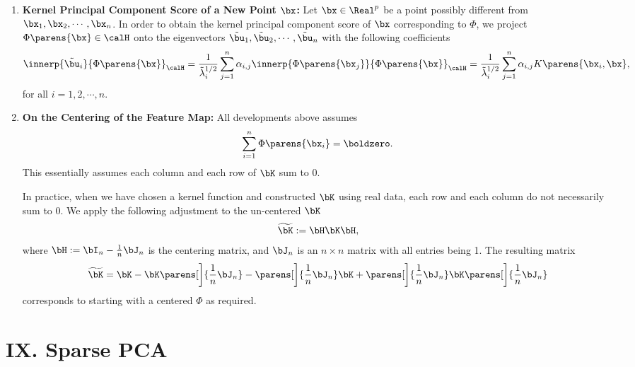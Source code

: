 \documentclass[12pt]{article}
\begin{document}
\begin{enumerate}[label=\textbf{\arabic*.}]
\begin{enumerate}
	\end{enumerate}
	
	\item \textbf{Kernel Principal Component Score of a New Point $\bx$:} Let $\bx \in \Real^p$ be a point possibly different from $\bx_1, \bx_2, \cdots, \bx_n$. In order to obtain the kernel principal component score of $\bx$ corresponding to $\Phi$, we project $\Phi \parens{\bx} \in \calH$ onto the eigenvectors $\tilde{\bu}_1, \tilde{\bu}_2, \cdots, \tilde{\bu}_n$ with the following coefficients 
	\begin{align*}
		\innerp{\tilde{\bu}_i}{\Phi \parens{\bx}}_{\calH} = \frac{1}{\tilde{\lambda}_i^{1/2}} \sum_{j=1}^n \alpha_{i,j} \innerp{\Phi \parens{\bx_j}}{\Phi \parens{\bx}}_{\calH} = \frac{1}{\tilde{\lambda}_i^{1/2}} \sum_{j=1}^n \alpha_{i,j} K \parens{\bx_i, \bx}, 
	\end{align*}
	for all $i = 1, 2, \cdots, n$. 
	
	\item \textbf{On the Centering of the Feature Map:} All developments above assumes 
	\begin{align*}
		\sum_{i=1}^n \Phi \parens{\bx_i} = \boldzero. 
	\end{align*}
	This essentially assumes each column and each row of $\bK$ sum to 0. 
	
	In practice, when we have chosen a kernel function and constructed $\bK$ using real data, each row and each column do not necessarily sum to 0. We apply the following adjustment to the un-centered $\bK$
	\begin{align*}
		\widetilde{\bK} := \bH \bK \bH, 
	\end{align*}
	where $\bH := \bI_n - \frac{1}{n} \bJ_n$ is the centering matrix, and $\bJ_n$ is an $n \times n$ matrix with all entries being 1. The resulting matrix 
	\begin{align*}
		\widetilde{\bK} = \bK - \bK \parens[\bigg]{\frac{1}{n} \bJ_n} - \parens[\bigg]{\frac{1}{n} \bJ_n} \bK + \parens[\bigg]{\frac{1}{n} \bJ_n} \bK \parens[\bigg]{\frac{1}{n} \bJ_n}
	\end{align*}
	corresponds to starting with a centered $\Phi$ as required. 
	
\end{enumerate}


\section*{IX. Sparse PCA}
\end{document}
